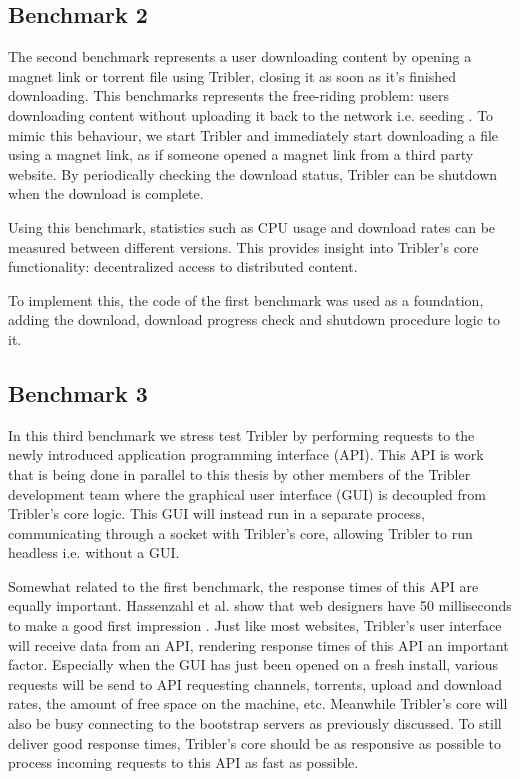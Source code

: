 \subsection{Benchmark 2}

The second benchmark represents a user downloading content by opening a magnet link or torrent file using Tribler, closing it as soon as it's finished downloading.
This benchmarks represents the free-riding problem: users downloading content without uploading it back to the network i.e. seeding \cite{adar2000free}.
To mimic this behaviour, we start Tribler and immediately start downloading a file using a magnet link, as if someone opened a magnet link from a third party website.
By periodically checking the download status, Tribler can be shutdown when the download is complete.

Using this benchmark, statistics such as CPU usage and download rates can be measured between different versions.
This provides insight into Tribler's core functionality: decentralized access to distributed content.

To implement this, the code of the first benchmark was used as a foundation, adding the download, download progress check and shutdown procedure logic to it.

\subsection{Benchmark 3}
\label{ssct:benchmark_3}

In this third benchmark we stress test Tribler by performing requests to the newly introduced application programming interface (API).
This API is work that is being done in parallel to this thesis by other members of the Tribler development team where the graphical user interface (GUI) is decoupled from Tribler's core logic.
This GUI will instead run in a separate process, communicating through a socket with Tribler's core, allowing Tribler to run headless i.e. without a GUI.

Somewhat related to the first benchmark, the response times of this API are equally important.
Hassenzahl et al. show that web designers have 50 milliseconds to make a good first impression \cite{lindgaard2006attention}.
Just like most websites, Tribler's user interface will receive data from an API, rendering response times of this API an important factor.
Especially when the GUI has just been opened on a fresh install, various requests will be send to API requesting channels, torrents, upload and download rates, the amount of free space on the machine, etc.
Meanwhile Tribler's core will also be busy connecting to the bootstrap servers as previously discussed.
To still deliver good response times, Tribler's core should be as responsive as possible to process incoming requests to this API as fast as possible.

